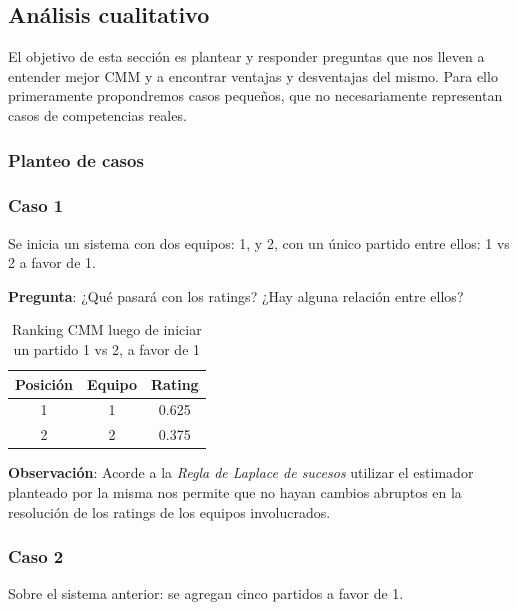 \subsection{Análisis cualitativo}

El objetivo de esta sección es plantear y responder preguntas que nos lleven a entender mejor CMM y a encontrar ventajas y desventajas del mismo. Para ello primeramente propondremos casos pequeños, que no necesariamente representan casos de competencias reales.

\subsubsection{Planteo de casos}

\subsubsection*{Caso 1}
Se inicia un sistema con dos equipos: 1, y 2, con un único partido entre ellos: 1 vs 2 a favor de 1.

\textbf{Pregunta}: ¿Qué pasará con los ratings? ¿Hay alguna relación entre ellos?

\begin{table}[h!]
    \begin{center}
        \begin{tabular}{|c|c|c|}
        \hline
        \textbf{Posición} & \textbf{Equipo} & \textbf{Rating} \\
        \hline
        1 & 1 & 0.625\\
        2 & 2 & 0.375\\
        \hline
        \end{tabular}
        \caption{Ranking CMM luego de iniciar un partido 1 vs 2, a favor de 1}
        \label{cmm_caso_1}
    \end{center}
\end{table}

\textbf{Observación}: Acorde a la \textit{Regla de Laplace de sucesos} utilizar el estimador planteado por la misma nos permite que no hayan cambios abruptos en la resolución de los ratings de los equipos involucrados.

\subsubsection*{Caso 2}

Sobre el sistema anterior: se agregan cinco partidos a favor de 1.

